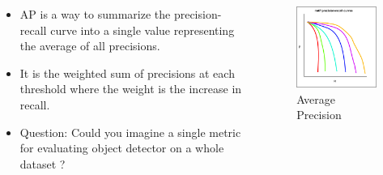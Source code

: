 \documentclass{beamer}
\begin{document}
\begin{frame}{}
	\begin{columns}
		\begin{column}{0.6\textwidth}
			\begin{itemize}
				\item AP is a way to summarize the precision-recall curve into a single value representing the average of all precisions.
				\item It is the weighted sum of precisions at each threshold where the weight is the increase in recall.
				\item Question: Could you imagine a single metric for evaluating object detector on a whole dataset ?
			\end{itemize}
		\end{column}
		\begin{column}{0.4\textwidth}
			\begin{figure}
				\includegraphics[width=\textwidth]{images/AP.png}
				\caption{Average Precision}
			\end{figure}
		\end{column} 
	\end{columns}
\end{frame}
\end{document}
